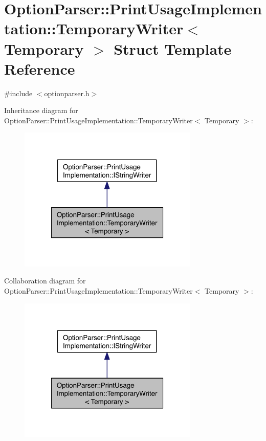 \hypertarget{struct_option_parser_1_1_print_usage_implementation_1_1_temporary_writer}{\section{Option\-Parser\-:\-:Print\-Usage\-Implementation\-:\-:Temporary\-Writer$<$ Temporary $>$ Struct Template Reference}
\label{struct_option_parser_1_1_print_usage_implementation_1_1_temporary_writer}
}


{\ttfamily \#include $<$optionparser.\-h$>$}



Inheritance diagram for Option\-Parser\-:\-:Print\-Usage\-Implementation\-:\-:Temporary\-Writer$<$ Temporary $>$\-:\nopagebreak
\begin{figure}[H]
\begin{center}
\leavevmode
\includegraphics[width=242pt]{struct_option_parser_1_1_print_usage_implementation_1_1_temporary_writer__inherit__graph}
\end{center}
\end{figure}


Collaboration diagram for Option\-Parser\-:\-:Print\-Usage\-Implementation\-:\-:Temporary\-Writer$<$ Temporary $>$\-:\nopagebreak
\begin{figure}[H]
\begin{center}
\leavevmode
\includegraphics[width=242pt]{struct_option_parser_1_1_print_usage_implementation_1_1_temporary_writer__coll__graph}
\end{center}
\end{figure}
